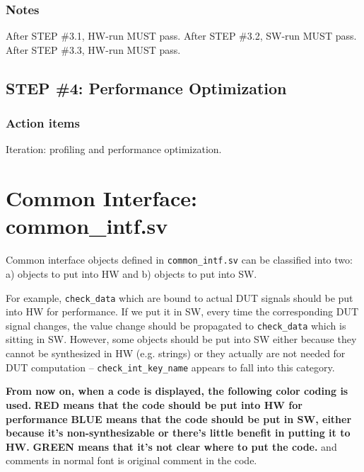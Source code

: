 \documentclass{note}
\begin{document}
\subsubsection{Notes}
\bit
\w \textcolor{red2}{After STEP \#3.1, HW-run MUST pass}.
\w \textcolor{red2}{After STEP \#3.2, SW-run MUST pass}.
\w \textcolor{red2}{After STEP \#3.3, HW-run MUST pass}.
\eit
\subsection{STEP \#4: Performance Optimization}
\subsubsection{Action items}
\bit
\w Iteration: profiling and performance optimization.
\eit


\section{Common Interface: common\_intf.sv}
Common interface objects defined in
\verb+common_intf.sv+ can be classified into two: a) objects to put into HW
and b) objects to put into SW. 

For example, \verb+check_data+ which are bound to
actual DUT signals should be put into HW for performance. If we put it in SW, every time the corresponding DUT signal changes, the value change should be propagated to \verb+check_data+ which is sitting in SW.
However, some objects should be put into SW either because they cannot be 
synthesized in HW (e.g. strings) or they actually are not needed for 
DUT computation -- \verb+check_int_key_name+ appears to fall into this category.  
\vspace*{0.3cm}

{\bf{} From now on, when a code is displayed, the following color coding is used.}
\bit
\w \textcolor{red2}{\bf{}RED means that the code should be put into HW for performance}
\w \textcolor{blue2}{\bf{}BLUE means that the code should be put in SW, either because it's non-synthesizable or there's little benefit in putting it to HW.}
\w \textcolor{green2}{\bf{}GREEN means that it's not clear where to put the code.}
\w {} and comments in normal font is original comment in the code.
\eit
\end{document}
